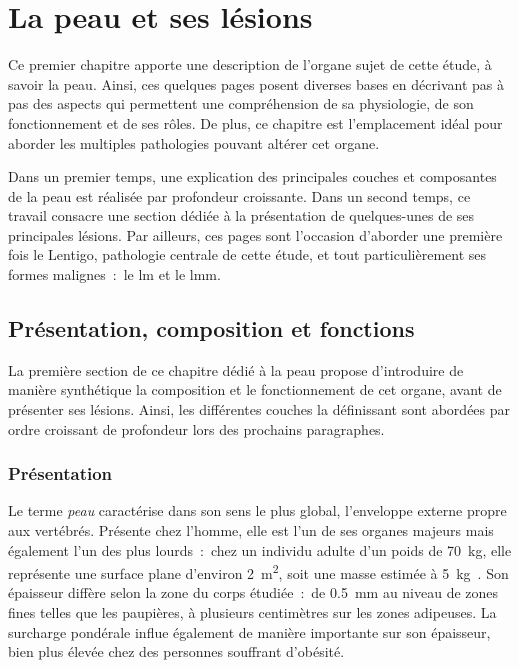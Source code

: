 \renewcommand{\thechapter}{\arabic{chapter}}
\setcounter{chapter}{0}

\chapter{La peau et ses lésions}
\label{chap:chapter_1}
\chapterintro
Ce premier chapitre apporte une description de l'organe sujet de cette étude, à savoir la peau. Ainsi, ces quelques pages posent diverses bases en décrivant pas à pas des aspects qui permettent une compréhension de sa physiologie, de son fonctionnement et de ses rôles. De plus, ce chapitre est l'emplacement idéal pour aborder les multiples pathologies pouvant altérer cet organe.\par

Dans un premier temps, une explication des principales couches et composantes de la peau est réalisée par profondeur croissante. Dans un second temps, ce travail consacre une section dédiée à la présentation de quelques-unes de ses principales lésions. Par ailleurs, ces pages sont l'occasion d'aborder une première fois le Lentigo, pathologie centrale de cette étude, et tout particulièrement ses formes malignes~:~le \acrlong{lm} et le \acrlong{lmm}.\par
\newpage

\section{Présentation, composition et fonctions}
La première section de ce chapitre dédié à la peau propose d'introduire de manière synthétique la composition et le fonctionnement de cet organe, avant de présenter ses lésions. Ainsi, les différentes couches la définissant sont abordées par ordre croissant de profondeur lors des prochains paragraphes.\par

\subsection{Présentation}
Le terme \textit{peau} caractérise dans son sens le plus global, l’enveloppe externe propre aux vertébrés. Présente chez l’homme, elle est l’un de ses organes majeurs mais également l’un des plus lourds~:~chez un individu adulte d’un poids de \SI{70}{\kilo\gram}, elle représente une surface plane d’environ \SI{2}{\metre\squared}, soit une masse estimée à \SI{5}{\kilo\gram}~\cite{McGrath2010}. Son épaisseur diffère selon la zone du corps étudiée~:~de \SI{0,5}{\milli\metre} au niveau de zones fines telles que les paupières, à plusieurs centimètres sur les zones adipeuses. La surcharge pondérale influe également de manière importante sur son épaisseur, bien plus élevée chez des personnes souffrant d'obésité.\par

